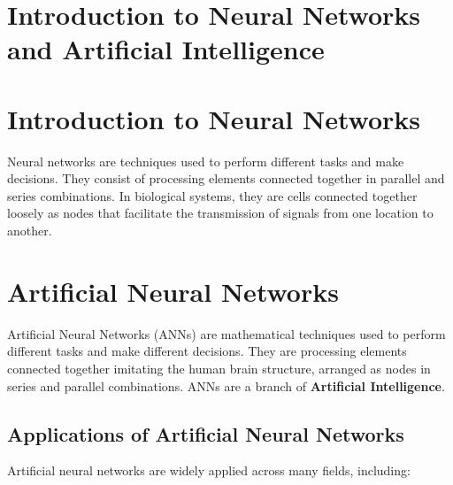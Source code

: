 \documentclass[12pt,a4paper]{article}
\begin{document}
\section*{Introduction to Neural Networks and Artificial Intelligence}

\section{Introduction to Neural Networks}

Neural networks are techniques used to perform different tasks and make decisions. They consist of processing elements connected together in parallel and series combinations. In biological systems, they are cells connected together loosely as nodes that facilitate the transmission of signals from one location to another.

\section{Artificial Neural Networks}

Artificial Neural Networks (ANNs) are mathematical techniques used to perform different tasks and make different decisions. They are processing elements connected together imitating the human brain structure, arranged as nodes in series and parallel combinations. ANNs are a branch of \textbf{Artificial Intelligence}.

\subsection{Applications of Artificial Neural Networks}

Artificial neural networks are widely applied across many fields, including:
\end{document}
